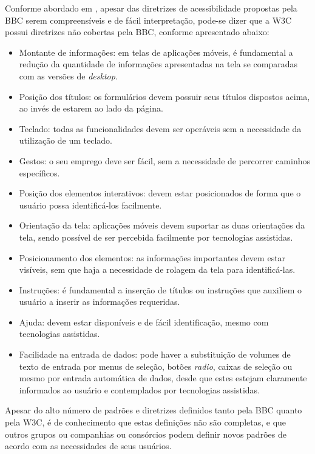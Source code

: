Conforme abordado em \cite{camilamaster}, apesar das diretrizes de acessibilidade propostas pela BBC serem compreensíveis e de fácil interpretação, pode-se dizer que a W3C possui diretrizes não cobertas pela BBC, conforme apresentado abaixo:
\begin{itemize}
	\item Montante de informações: em telas de aplicações móveis, é fundamental a redução da quantidade de informações apresentadas na tela se comparadas com as versões de \textit{desktop}.
	\item Posição dos títulos: os formulários devem possuir seus títulos dispostos acima, ao invés de estarem ao lado da página.
	\item Teclado: todas as funcionalidades devem ser operáveis sem a necessidade da utilização de um teclado.
	\item Gestos: o seu emprego deve ser fácil, sem a necessidade de percorrer caminhos específicos.
	\item Posição dos elementos interativos: devem estar posicionados de forma que o usuário possa identificá-los facilmente.
	\item Orientação da tela: aplicações móveis devem suportar as duas orientações da tela, sendo possível de ser percebida facilmente por tecnologias assistidas.
	\item Posicionamento dos elementos: as informações importantes devem estar visíveis, sem que haja a necessidade de rolagem da tela para identificá-las.
	\item Instruções: é fundamental a inserção de títulos ou instruções que auxiliem o usuário a inserir as informações requeridas.
	\item Ajuda: devem estar disponíveis e de fácil identificação, mesmo com tecnologias assistidas.
	\item Facilidade na entrada de dados: pode haver a substituição de volumes de texto de entrada por menus de seleção, botões \textit{radio}, caixas de seleção ou mesmo por entrada automática de dados, desde que estes estejam claramente informados ao usuário e contemplados por tecnologias assistidas.
\end{itemize}

Apesar do alto número de padrões e diretrizes definidos tanto pela BBC quanto pela W3C, é de conhecimento que estas definições não são completas, e que outros grupos ou companhias ou consórcios podem definir novos padrões de acordo com as necessidades de seus usuários. 




